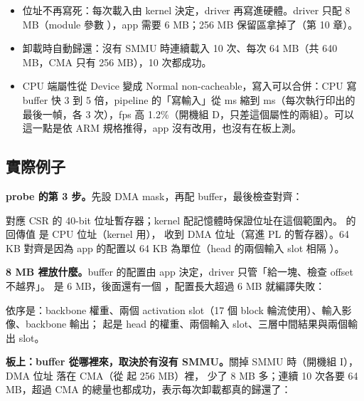 \begin{gain}
\begin{itemize}
\item 位址不再寫死：每次載入由 kernel 決定，driver 再寫進硬體。driver 只配 8 MB（module 參數 ），app 需要 6 MB；256 MB 保留區拿掉了（第 10 章）。
\item 卸載時自動歸還：沒有 SMMU 時連續載入 10 次、每次 64 MB（共 640 MB，CMA 只有 256 MB），10 次都成功。
\item CPU 端屬性從 Device 變成 Normal non-cacheable，寫入可以合併：CPU 寫 buffer 快 3 到 5 倍，pipeline 的「寫輸入」從 \splitDevIn{} ms 縮到 \splitNcIn{} ms（每次執行印出的最後一幀，各 3 次），fps 高 1.2\%（開機組 D，只差這個屬性的兩組）。可以  這一點是依 ARM 規格推得，app 沒有改用，也沒有在板上測。
\end{itemize}
\end{gain}

\subsection{實際例子}

\textbf{probe 的第 3 步。}先設 DMA mask，再配 buffer，最後檢查對齊：


 對應 CSR 的 40-bit 位址暫存器；kernel 配記憶體時保證位址在這個範圍內。 的回傳值  是 CPU 位址（kernel 用）， 收到 DMA 位址（寫進 PL 的暫存器）。64 KB 對齊是因為 app 的配置以 64 KB 為單位（head 的兩個輸入 slot 相隔 ）。

\textbf{8 MB 裡放什麼。}buffer 的配置由 app 決定，driver 只管「給一塊、檢查 offset 不越界」。 是 6 MB，後面還有一個 ，配置長大超過 6 MB 就編譯失敗：


依序是：backbone 權重、兩個 activation slot（17 個 block 輪流使用）、輸入影像、backbone 輸出； 起是 head 的權重、兩個輸入 slot、三層中間結果與兩個輸出 slot。

\textbf{板上：buffer 從哪裡來，取決於有沒有 SMMU。}關掉 SMMU 時（開機組 I），DMA 位址  落在 CMA（從  起 256 MB）裡， 少了 8 MB 多；連續 10 次各要 64 MB，超過 CMA 的總量也都成功，表示每次卸載都真的歸還了：


